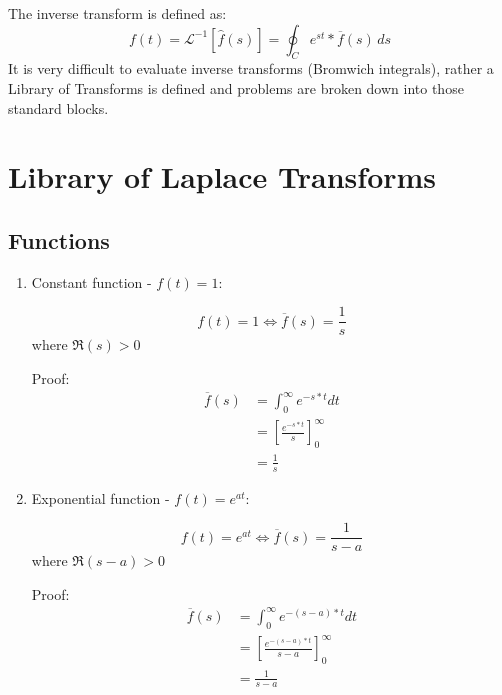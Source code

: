 \documentclass[10pt,a4paper]{article}
\begin{document}
The inverse transform is defined as: 
$$f(t)=
     \mathcal{L}^{-1}[\hat{f}(s)]=\oint_C e^{st}*\overline{f}(s)\,ds$$
It is very difficult to evaluate inverse transforms (Bromwich integrals), rather a Library of
Transforms is defined and problems are broken down into those standard blocks.

\section{Library of Laplace Transforms}
\subsection{Functions}
 \begin{enumerate}
     \item Constant function - $f(t)=1$:
     \begin{tcolorbox}[breakable,colback=white,colframe=black,width=\dimexpr\textwidth+12mm\relax,enlarge left by=-6mm]
        \begin{equation*} 
            f(t)=1 \Leftrightarrow \overline{f}(s)=\frac{1}{s} 
        \end{equation*}
        where $\Re (s)>0$
     \end{tcolorbox}
     Proof: 
     \begin{equation*} 
        \begin{aligned}
            \overline{f}(s)&=\int_{0}^{\infty}e^{-s*t} dt 
            \\ &=\left[ \frac{e^{-s*t}}{s} \right]_0^\infty 
            \\ &= \frac{1}{s}
        \end{aligned}
     \end{equation*}

     \item Exponential function - $f(t)=e^{at}$:
     \begin{tcolorbox}[breakable,colback=white,colframe=black,width=\dimexpr\textwidth+12mm\relax,enlarge left by=-6mm]
        \begin{equation*} 
            f(t)=e^{at} \Leftrightarrow \overline{f}(s)=\frac{1}{s-a} 
        \end{equation*}
        where $\Re (s-a)>0$
     \end{tcolorbox}
     Proof: 
     \begin{equation*} 
        \begin{aligned}
            \overline{f}(s)&=\int_{0}^{\infty}e^{-(s-a)*t} dt 
            \\ &=\left[ \frac{e^{-(s-a)*t}}{s-a} \right]_0^\infty 
            \\ &= \frac{1}{s-a}
        \end{aligned}
     \end{equation*}


\end{enumerate}
\end{document}
